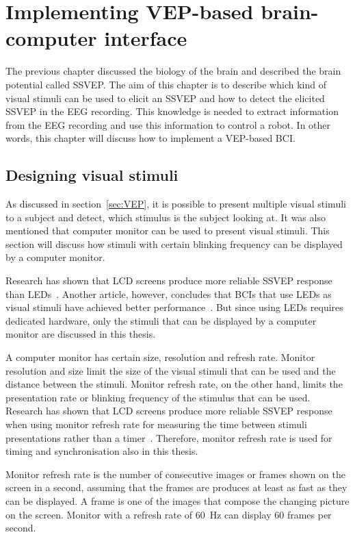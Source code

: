 
\chapter{Implementing VEP-based brain-computer interface}

The previous chapter discussed the biology of the brain and described the brain potential called \gls{SSVEP}. The aim of this chapter is to describe which kind of visual stimuli can be used to elicit an \gls{SSVEP} and how to detect the elicited \gls{SSVEP} in the \gls{EEG} recording. This knowledge is needed to extract information from the \gls{EEG} recording and use this information to control a robot. In other words, this chapter will discuss how to implement a \gls{VEP}-based \gls{BCI}.

\section{Designing visual stimuli}
\label{sec:stimuli}

As discussed in section~\ref{sec:VEP}, it is possible to present multiple visual stimuli to a subject and detect, which stimulus is the subject looking at. It was also mentioned that computer monitor can be used to present visual stimuli. This section will discuss how stimuli with certain blinking frequency can be displayed by a computer monitor.

Research has shown that LCD screens produce more reliable \gls{SSVEP} response than \glspl{LED}~\cite{lcd_lcd_led}. Another article, however, concludes that \glspl{BCI} that use \glspl{LED} as visual stimuli have achieved better performance~\cite{ssvep_stim}. But since using \glspl{LED} requires dedicated hardware, only the stimuli that can be displayed by a computer monitor are discussed in this thesis.

A computer monitor has certain size, resolution and \gls{refresh rate}. Monitor resolution and size limit the size of the visual stimuli that can be used and the distance between the stimuli. Monitor \gls{refresh rate}, on the other hand, limits the presentation rate or blinking frequency of the stimulus that can be used. Research has shown that LCD screens produce more reliable \gls{SSVEP} response when using monitor \gls{refresh rate} for measuring the time between stimuli presentations rather than a timer~\cite{lcd_lcd_led}. Therefore, monitor \gls{refresh rate} is used for timing and synchronisation also in this thesis.

Monitor \gls{refresh rate} is the number of consecutive images or \glspl{frame} shown on the screen in a second, assuming that the \glspl{frame} are produces at least as fast as they can be displayed. A \gls{frame} is one of the images that compose the changing picture on the screen. Monitor with a \gls{refresh rate} of \SI{60}{Hz} can display 60 \glspl{frame} per second. 

